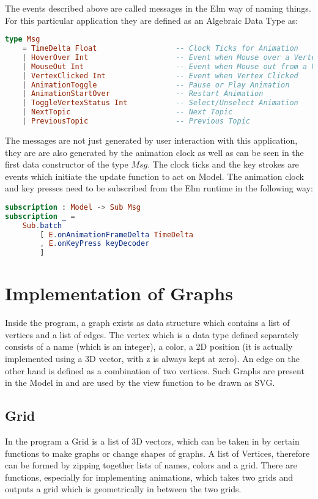 The events described above are called messages in the Elm way of naming things. For this particular
application they are defined as an Algebraic Data Type as:
\begin{lstlisting}[language=elm]
type Msg
    = TimeDelta Float                  -- Clock Ticks for Animation
    | HoverOver Int                    -- Event when Mouse over a Vertex                              
    | MouseOut Int                     -- Event when Mouse out from a Vertex                               
    | VertexClicked Int                -- Event when Vertex Clicked                              
    | AnimationToggle                  -- Pause or Play Animation
    | AnimationStartOver               -- Restart Animation
    | ToggleVertexStatus Int           -- Select/Unselect Animation
    | NextTopic                        -- Next Topic
    | PreviousTopic                    -- Previous Topic
\end{lstlisting}
The messages are not just generated by user interaction with this application,
they are are also generated by the animation clock as well as can be seen in
the first data constructor of the type $Msg$.
The clock ticks and the key strokes are events which initiate the update function to act on Model.
The animation clock and key presses need to be subscribed from the Elm runtime in the following way:
\begin{lstlisting}[language=elm]
subscription : Model -> Sub Msg
subscription _ =
    Sub.batch
        [ E.onAnimationFrameDelta TimeDelta
        , E.onKeyPress keyDecoder
        ]
\end{lstlisting}

\section{Implementation of Graphs}
Inside the program, a graph exists as data structure which contains a list of
vertices and a list of edges. The vertex which is a data type defined
separately consists of a name (which is an integer), a color, a 2D position (it
is actually implemented using a 3D vector, with z is always kept at zero).  An
edge on the other hand is defined as a combination of two vertices. Such Graphs
are present in the Model in and are used by the view function to be drawn as
SVG.

\subsection{Grid}
In the program a Grid is a list of 3D vectors, which can be taken in by certain
functions to make graphs or change shapes of graphs.  A list of Vertices,
therefore can be formed by zipping together lists of names, colors and a grid.
There are functions, especially for implementing animations, which takes two
grids and outputs a grid which is geometrically in between the two grids.


